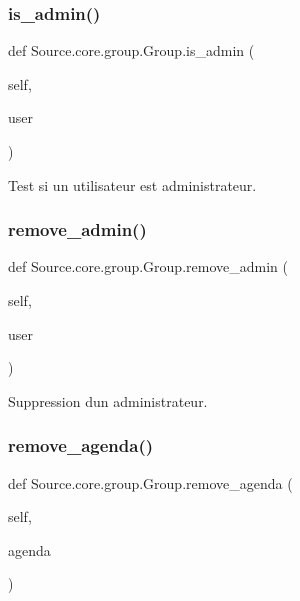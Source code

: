 \subsubsection{\texorpdfstring{is\+\_\+admin()}{is\_admin()}}
{\footnotesize\ttfamily def Source.\+core.\+group.\+Group.\+is\+\_\+admin (\begin{DoxyParamCaption}\item[{}]{self,  }\item[{}]{user }\end{DoxyParamCaption})}



Test si un utilisateur est administrateur. 

\mbox{\label{classSource_1_1core_1_1group_1_1Group_a08ca8a3d7a46d06841e454094b0d3504}} 
\subsubsection{\texorpdfstring{remove\+\_\+admin()}{remove\_admin()}}
{\footnotesize\ttfamily def Source.\+core.\+group.\+Group.\+remove\+\_\+admin (\begin{DoxyParamCaption}\item[{}]{self,  }\item[{}]{user }\end{DoxyParamCaption})}



Suppression d\textquotesingle{}un administrateur. 

\mbox{\label{classSource_1_1core_1_1group_1_1Group_ad9acb8c0acca1abf60bba16d21bb60a3}} 
\subsubsection{\texorpdfstring{remove\+\_\+agenda()}{remove\_agenda()}}
{\footnotesize\ttfamily def Source.\+core.\+group.\+Group.\+remove\+\_\+agenda (\begin{DoxyParamCaption}\item[{}]{self,  }\item[{}]{agenda }\end{DoxyParamCaption})}



